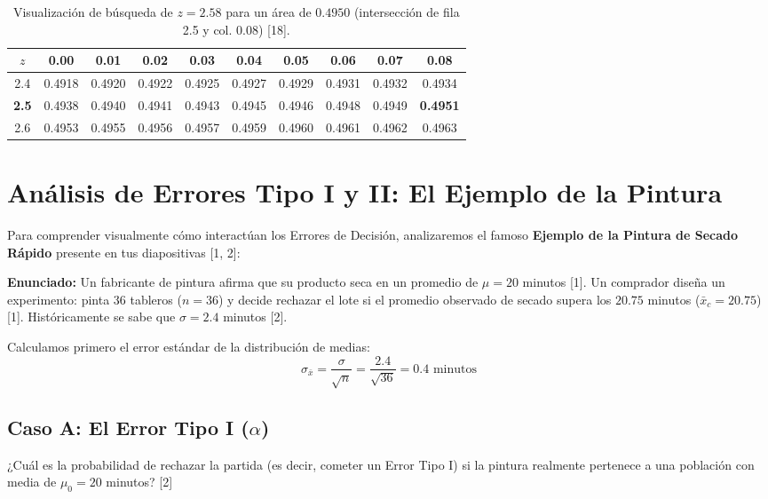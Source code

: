 \documentclass{article}
\begin{document}
\begin{table}[h!]
\centering
\small
\begin{tabular}{cccccccccc}
\toprule
\textbf{$z$} & \textbf{0.00} & \textbf{0.01} & \textbf{0.02} & \textbf{0.03} & \textbf{0.04} & \textbf{0.05} & \textbf{0.06} & \textbf{0.07} & \cellcolor{red!20}\textbf{0.08} \\
\midrule
2.4 & 0.4918 & 0.4920 & 0.4922 & 0.4925 & 0.4927 & 0.4929 & 0.4931 & 0.4932 & 0.4934 \\
\rowcolor{red!10}
\textbf{2.5} & 0.4938 & 0.4940 & 0.4941 & 0.4943 & 0.4945 & 0.4946 & 0.4948 & 0.4949 & \cellcolor{red!30}\textbf{0.4951} \\
2.6 & 0.4953 & 0.4955 & 0.4956 & 0.4957 & 0.4959 & 0.4960 & 0.4961 & 0.4962 & 0.4963 \\
\bottomrule
\end{tabular}
\caption{Visualización de búsqueda de $z = 2.58$ para un área de $0.4950$ (intersección de fila 2.5 y col. 0.08) [18].}
\end{table}

\newpage
\section{Análisis de Errores Tipo I y II: El Ejemplo de la Pintura}

Para comprender visualmente cómo interactúan los Errores de Decisión, analizaremos el famoso \textbf{Ejemplo de la Pintura de Secado Rápido} presente en tus diapositivas [1, 2]:

\textbf{Enunciado:} Un fabricante de pintura afirma que su producto seca en un promedio de $\mu = 20$ minutos [1]. Un comprador diseña un experimento: pinta 36 tableros ($n=36$) y decide rechazar el lote si el promedio observado de secado supera los $20.75$ minutos ($\bar{x}_c = 20.75$) [1]. Históricamente se sabe que $\sigma = 2.4$ minutos [2].

Calculamos primero el error estándar de la distribución de medias:
\[
\sigma_{\bar{x}} = \frac{\sigma}{\sqrt{n}} = \frac{2.4}{\sqrt{36}} = 0.4 \text{ minutos}
\]

\subsection{Caso A: El Error Tipo I ($\alpha$)}
¿Cuál es la probabilidad de rechazar la partida (es decir, cometer un Error Tipo I) si la pintura realmente pertenece a una población con media de $\mu_0 = 20$ minutos? [2]
\end{document}

